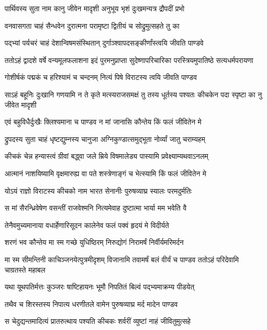 \twolineshloka
{पार्थिवस्य सुता नाम कानु जीवेन मादृशी}
{अनुभूय भृशं दुःखमन्यत्र द्रौपदीं प्रभो}


\twolineshloka
{वनवासगता चाहं सैन्धवेन दुरात्मना}
{परामृष्टा द्वितीयं च सोद्रुमुत्सहते तु का}


\twolineshloka
{पद्भ्यां पर्यचरं चाहं देशान्विषमसंस्थितान्}
{दुर्गाञ्श्वापदसङ्कीर्णांस्त्वयि जीवति पाण्डवे}


\threelineshloka
{ततोऽहं द्वादशे वर्षे वन्यमूलफलाशना}
{इदं पुरमनुप्राप्ता सुदेष्णापरिचारिका}
{परस्त्रियमुपातिष्ठे सत्यधर्मपरायणा}


\twolineshloka
{गोशीर्षकं पद्मकं च हरिश्यामं च चन्दनम्}
{नित्यं पिषे विराटस्य त्वयि जीवति पाण्डव}


\onelineshloka
{साऽहं बहूनिः दुःखानि गणयामि न ते कृते}
\twolineshloka
{मत्स्यराजसमक्षं तु तस्य धूर्तस्य पश्यतः}
{कीचकेन पदा स्पृष्टा का नु जीवेत मादृशी}


\twolineshloka
{एवं बहुविधैर्दुःखैः क्लिश्यमाना च पाण्डव}
{न मां जानासि कौन्तेय किं फलं जीवितेन मे}


\twolineshloka
{द्रुपदस्य सुता चाहं धृष्टद्युम्नस्य चानुजा}
{अग्निकुण्डात्समुद्भूता नोर्व्यां जातु चराम्यहम्}


\twolineshloka
{कीचकं चेन्न हन्यास्त्वं ग्रीवां बद्ध्वा जले म्रिये}
{विषमालेड्य पास्यामि प्रवेक्ष्याम्यथवाऽनलम्}


\twolineshloka
{आत्मानं नाशयिष्यामि वृक्षमारुह्य वा पते}
{शस्त्रेणाङ्गं च भेत्स्यामि किं फलं जीवितेन मे}


\twolineshloka
{योऽयं राज्ञो विराटस्य कीचको नाम भारत}
{सेनानीः पुरुषव्याघ्र स्यालः परमदुर्मतिः}


\twolineshloka
{स मां सैरन्ध्रिवेषेण वसन्तीं राजवेश्मनि}
{नित्यमेवाह दुष्टात्मा भार्या मम भवेति वै}


\twolineshloka
{तेनैवमुच्यमानाया वधार्हेणारिसूदन}
{कालेनेव फलं पक्वं हृदयं मे विदीर्यते}


\twolineshloka
{शरणं भव कौन्तेय मा स्म गच्छे युधिष्ठिरम्}
{निरुद्योगं निरामर्षं निर्वीर्यमरिमर्दन}


\onelineshloka
{मा स्म सीमन्तिनी काचिञ्जनयेत्पुत्रमीदृशम्}
\twolineshloka
{विजानामि तवामर्षं बलं वीर्यं च पाण्डव}
{ततोऽहं परिदेवामि चाग्रतस्ते महाबल}


\twolineshloka
{यथा यूथपतिर्मत्तः कुञ्जरः षाष्टिहायनः}
{भूमौ निपतितं बिल्वं पद्भ्यमाक्रम्य पीडयेत्}


\twolineshloka
{तथैव च शिरस्तस्य निपात्य धरणीतले}
{वामेन पुरुषव्याघ्र मर्द मादेन पाण्डव}


\twolineshloka
{स चेदुद्यन्तमादित्यं प्रातरुत्थाय पश्यति}
{कीचकः शर्वरीं व्युष्टां नाहं जीवितुमुत्सहे}


